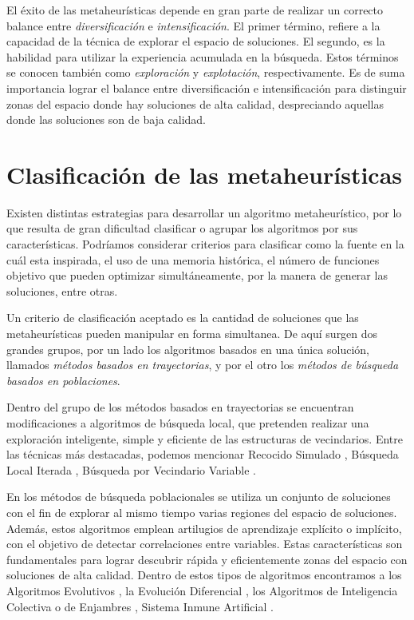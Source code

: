 El éxito de las metaheurísticas depende en gran parte de realizar un correcto balance entre
\textit{diversificación} e \textit{intensificación}. El primer término, refiere a la capacidad de la técnica de explorar el espacio de soluciones. El segundo, es la habilidad para utilizar la experiencia acumulada en la búsqueda. Estos términos se conocen también como \textit{exploración} y \textit{explotación}, respectivamente. Es de suma importancia lograr el balance entre diversificación e intensificación para distinguir zonas del espacio donde hay soluciones de alta calidad, despreciando aquellas donde las soluciones son de baja calidad.


\section{Clasificación de las metaheurísticas}
Existen distintas estrategias para desarrollar un algoritmo metaheurístico, por lo que resulta de gran dificultad clasificar o agrupar los algoritmos por sus características. Podríamos considerar criterios para clasificar como la fuente en la cuál esta inspirada, el uso de una memoria histórica, el número de funciones objetivo que pueden optimizar simultáneamente, por la manera de generar las soluciones, entre otras.


Un criterio de clasificación aceptado es la cantidad de soluciones que las metaheurísticas pueden manipular en forma simultanea. De aquí surgen dos grandes grupos, por un lado los algoritmos basados en una única solución, llamados \textit{métodos basados en trayectorias}, y por el otro los \textit{métodos de búsqueda basados en poblaciones}.


Dentro del grupo de los métodos basados en trayectorias se encuentran modificaciones a algoritmos de búsqueda local, que pretenden realizar una exploración inteligente, simple y eficiente de las estructuras de vecindarios. Entre las técnicas más destacadas, podemos mencionar Recocido Simulado \cite{LaarhovenAarts}, Búsqueda Local Iterada \cite{LourencoStutzle}, Búsqueda por Vecindario Variable \cite{HansenMladenovicBrimbergPerez}.

En los métodos de búsqueda poblacionales se utiliza un conjunto de soluciones con el fin de explorar al mismo tiempo varias regiones del espacio de soluciones. Además, estos algoritmos emplean artilugios de aprendizaje explícito o implícito, con el objetivo de detectar correlaciones entre variables. Estas características son fundamentales para lograr descubrir rápida y eficientemente zonas del espacio con soluciones de alta calidad. Dentro de estos tipos de algoritmos encontramos a los Algoritmos Evolutivos \cite{GendreauPotvin, BackFogelMichalewicz}, la Evolución Diferencial \cite{PriceStornLampinen}, los Algoritmos de Inteligencia Colectiva o de Enjambres \cite{KennedyEberhartShi, BlumLi}, Sistema Inmune Artificial \cite{Dasgupta}.



